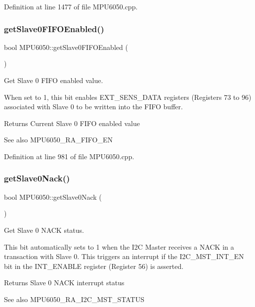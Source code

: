 Definition at line 1477 of file M\+P\+U6050.\+cpp.

\mbox{\label{classMPU6050_a6aa7aa2e3fac06f8b5ab9ee127255a5e}} 
\subsubsection{\texorpdfstring{getSlave0FIFOEnabled()}{getSlave0FIFOEnabled()}}
{\footnotesize\ttfamily bool M\+P\+U6050\+::get\+Slave0\+F\+I\+F\+O\+Enabled (\begin{DoxyParamCaption}{ }\end{DoxyParamCaption})}



Get Slave 0 F\+I\+FO enabled value. 

When set to 1, this bit enables E\+X\+T\+\_\+\+S\+E\+N\+S\+\_\+\+D\+A\+TA registers (Registers 73 to 96) associated with Slave 0 to be written into the F\+I\+FO buffer. \begin{DoxyReturn}{Returns}
Current Slave 0 F\+I\+FO enabled value 
\end{DoxyReturn}
\begin{DoxySeeAlso}{See also}
M\+P\+U6050\+\_\+\+R\+A\+\_\+\+F\+I\+F\+O\+\_\+\+EN 
\end{DoxySeeAlso}


Definition at line 981 of file M\+P\+U6050.\+cpp.

\mbox{\label{classMPU6050_a74511edfcada3fb21c3327a0c846c72a}} 
\subsubsection{\texorpdfstring{getSlave0Nack()}{getSlave0Nack()}}
{\footnotesize\ttfamily bool M\+P\+U6050\+::get\+Slave0\+Nack (\begin{DoxyParamCaption}{ }\end{DoxyParamCaption})}



Get Slave 0 N\+A\+CK status. 

This bit automatically sets to 1 when the I2C Master receives a N\+A\+CK in a transaction with Slave 0. This triggers an interrupt if the I2\+C\+\_\+\+M\+S\+T\+\_\+\+I\+N\+T\+\_\+\+EN bit in the I\+N\+T\+\_\+\+E\+N\+A\+B\+LE register (Register 56) is asserted. \begin{DoxyReturn}{Returns}
Slave 0 N\+A\+CK interrupt status 
\end{DoxyReturn}
\begin{DoxySeeAlso}{See also}
M\+P\+U6050\+\_\+\+R\+A\+\_\+\+I2\+C\+\_\+\+M\+S\+T\+\_\+\+S\+T\+A\+T\+US 
\end{DoxySeeAlso}



